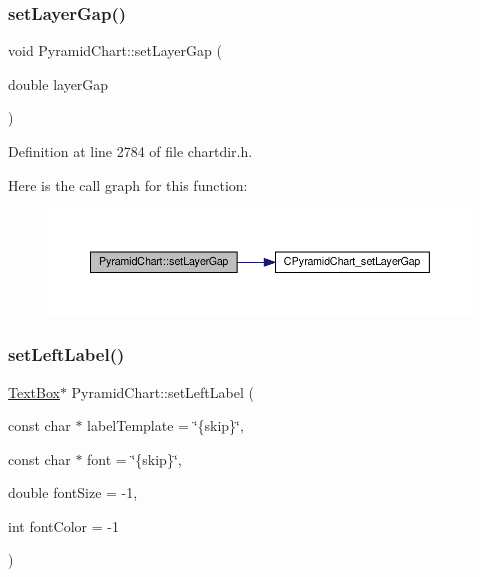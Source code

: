 \subsubsection{\texorpdfstring{set\+Layer\+Gap()}{setLayerGap()}}
{\footnotesize\ttfamily void Pyramid\+Chart\+::set\+Layer\+Gap (\begin{DoxyParamCaption}\item[{double}]{layer\+Gap }\end{DoxyParamCaption})\hspace{0.3cm}{\ttfamily [inline]}}



Definition at line 2784 of file chartdir.\+h.

Here is the call graph for this function\+:
\nopagebreak
\begin{figure}[H]
\begin{center}
\leavevmode
\includegraphics[width=350pt]{class_pyramid_chart_af3665fa72ba30465f59d2b8dc54eeaaf_cgraph}
\end{center}
\end{figure}
\mbox{\label{class_pyramid_chart_a0ddce92ecb98662bdc6cb7c9538353ee}} 
\subsubsection{\texorpdfstring{set\+Left\+Label()}{setLeftLabel()}}
{\footnotesize\ttfamily \hyperlink{class_text_box}{Text\+Box}$\ast$ Pyramid\+Chart\+::set\+Left\+Label (\begin{DoxyParamCaption}\item[{const char $\ast$}]{label\+Template = {\ttfamily \char`\"{}\{skip\}\char`\"{}},  }\item[{const char $\ast$}]{font = {\ttfamily \char`\"{}\{skip\}\char`\"{}},  }\item[{double}]{font\+Size = {\ttfamily -\/1},  }\item[{int}]{font\+Color = {\ttfamily -\/1} }\end{DoxyParamCaption})\hspace{0.3cm}{\ttfamily [inline]}}



